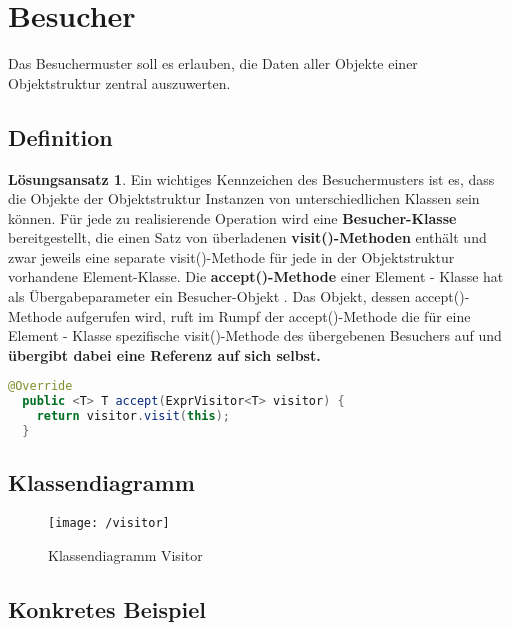 \documentclass[12pt,a4paper,titlepage]{article}
\theoremstyle{definition}
\newtheorem*{definition*}{Lösungsansatz}
\begin{document}
\section{Besucher}
Das Besuchermuster soll es erlauben, die Daten aller Objekte einer Objektstruktur zentral auszuwerten.

\subsection{Definition}
\begin{definition*}
Ein wichtiges Kennzeichen des Besuchermusters ist es, dass die Objekte der Objektstruktur Instanzen von unterschiedlichen Klassen sein können.
\newline
Für jede zu realisierende Operation wird eine \textbf{Besucher-Klasse} bereitgestellt, die einen Satz von überladenen \textbf{visit()-Methoden} enthält und zwar jeweils eine separate visit()-Methode für jede in der Objektstruktur vorhandene Element-Klasse. 
\newline
Die \textbf{accept()-Methode} einer Element - Klasse hat als Übergabeparameter ein Besucher-Objekt . Das Objekt, dessen accept()-Methode aufgerufen wird, ruft im Rumpf der accept()-Methode die für eine Element - Klasse spezifische visit()-Methode des übergebenen Besuchers auf und \textbf{übergibt dabei eine Referenz auf sich selbst.}
\end{definition*}
\begin{lstlisting}[language=Java, caption=Beispiel Accept-Methode]
  @Override
  public <T> T accept(ExprVisitor<T> visitor) {
    return visitor.visit(this);
  }
\end{lstlisting}

\newpage

\subsection{Klassendiagramm}

\begin{figure}[htbp]
\begin{center}
\texttt{[image: /visitor]}

\caption{Klassendiagramm Visitor}
\label{default}
\end{center}
\end{figure}

\subsection{Konkretes Beispiel}
\end{document}
